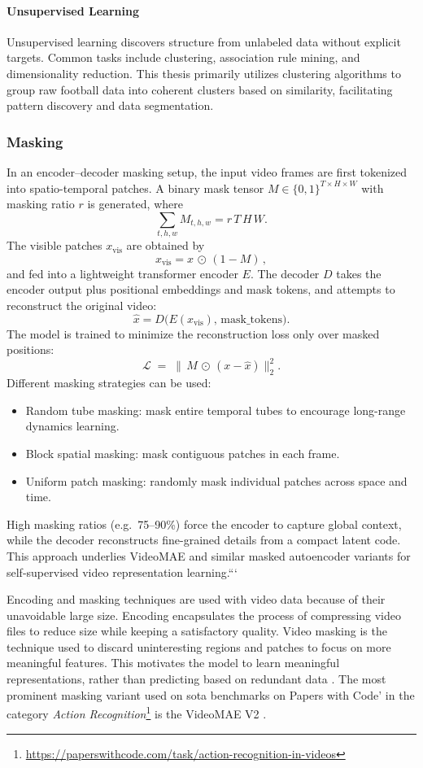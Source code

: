 \paragraph{Unsupervised Learning}
Unsupervised learning discovers structure from unlabeled data without explicit targets. Common tasks include clustering, association rule mining, and dimensionality reduction. This thesis primarily utilizes clustering algorithms to group raw football data into coherent clusters based on similarity, facilitating pattern discovery and data segmentation.

\subsubsection{Masking}

In an encoder–decoder masking setup, the input video frames are first tokenized into spatio-temporal patches. A binary mask tensor \(M\in\{0,1\}^{T\times H\times W}\) with masking ratio \(r\) is generated, where
\[
\sum_{t,h,w} M_{t,h,w} = r\,T\,H\,W.
\]
The visible patches \(x_\text{vis}\) are obtained by
\[
x_\text{vis} = x \,\odot\,(1 - M)\,,
\]
and fed into a lightweight transformer encoder \(E\). The decoder \(D\) takes the encoder output plus positional embeddings and mask tokens, and attempts to reconstruct the original video:
\[
\hat{x} = D\bigl(E(x_\text{vis}),\,\text{mask\_tokens}\bigr).
\]
The model is trained to minimize the reconstruction loss only over masked positions:
\[
\mathcal{L} \;=\; \bigl\lVert\,M \,\odot\,(x - \hat{x})\bigr\rVert_2^2.
\]
Different masking strategies can be used:
\begin{itemize}
    \item Random tube masking: mask entire temporal tubes to encourage long-range dynamics learning.
    \item Block spatial masking: mask contiguous patches in each frame.
    \item Uniform patch masking: randomly mask individual patches across space and time.
\end{itemize}
High masking ratios (e.g.\ 75–90\%) force the encoder to capture global context, while the decoder reconstructs fine-grained details from a compact latent code. This approach underlies VideoMAE and similar masked autoencoder variants for self-supervised video representation learning.```


Encoding and masking techniques are used with video data because of their unavoidable large size. Encoding encapsulates the process of compressing video files to reduce size while keeping a satisfactory quality. Video masking is the technique used to discard uninteresting regions and patches to focus on more meaningful features. This motivates the model to learn meaningful representations, rather than predicting based on redundant data \cite{tong_videomae_2022}. The most prominent masking variant used on \acrshort{sota} benchmarks on Papers with Code' in the category \textit{Action Recognition}\footnote{\url{https://paperswithcode.com/task/action-recognition-in-videos}} is the VideoMAE V2 \cite{wang_videomae_2023}. 

